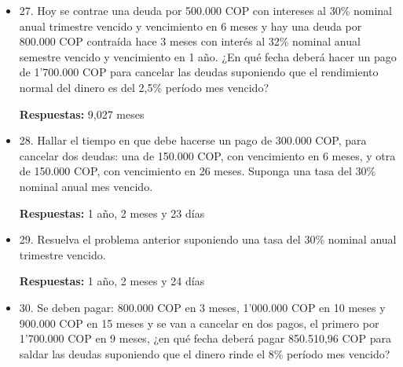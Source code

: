 \begin{itemize}
       a)	En caja 80.000 COP\\
       b)	En bancos 250.000 COP\\
       c)	Cuentas por cobrar \\
       C1 cheque por 65.000 COP para el 30 de septiembre\\
       C2 depósito a término fijo de 6 meses por 235.000 COP e intereses al 28\% nominal anual mes vencido, la inversión se efectuó hace 3 meses.\\
       d)	Mercancías por 950.000 COP\\
       e)	Cuentas por pagar:\\
       D1 cheque por 150.000 COP para el 21 de septiembre\\
       D2 letra por 400.000 COP para el 18 de noviembre.\\

       Con un interés del 30\% nominal anual año vencido usando interés bancario, determine el valor del almacén el día de la venta.
       
       \textbf{Respuestas:} 1’074.317 COP
       \medskip

 \item 27. Hoy se contrae una deuda por 500.000 COP con intereses al 30\% nominal anual trimestre vencido y vencimiento en 6 meses y hay una deuda por 800.000 COP contraída hace 3 meses con interés al 32\% nominal anual semestre vencido  y vencimiento en 1 año. ¿En qué fecha deberá hacer un pago de 1’700.000 COP para cancelar las deudas suponiendo que el rendimiento normal del dinero es del 2,5\% período mes vencido?
 
       \textbf{ Respuestas:} 9,027 meses
       \medskip

 \item 28. Hallar el tiempo en que debe hacerse un pago de 300.000 COP, para cancelar dos deudas: una de 150.000 COP, con vencimiento en 6 meses, y otra de 150.000 COP, con vencimiento en 26 meses. Suponga una tasa del 30\% nominal anual mes vencido.
 
       \textbf{Respuestas:} 1 año, 2 meses y 23 días
       \medskip

 \item 29. Resuelva el problema anterior suponiendo una tasa del 30\% nominal anual trimestre vencido.
 
       \textbf{Respuestas:} 1 año, 2 meses y 24 días
       \medskip

 \item 30. Se deben pagar: 800.000 COP en 3 meses, 1’000.000 COP en 10 meses y 900.000 COP en 15 meses y se van a cancelar en dos pagos, el primero por 1’700.000 COP en 9 meses,  ¿en qué fecha deberá pagar 850.510,96 COP para saldar las deudas suponiendo que el dinero rinde el 8\% período mes vencido?
 

\end{itemize}
